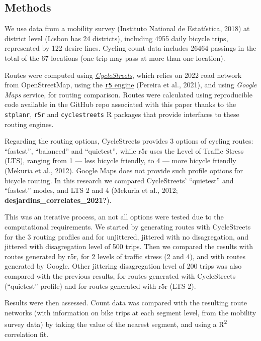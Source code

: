 \documentclass{isprs} %
\begin{document}
\hypertarget{methods}{%
\subsection{Methods}\label{methods}}

We use data from a mobility survey (Instituto National de Estatística, 2018) at district level (Lisbon has 24 districts), including 4955 daily bicycle trips, represented by 122 desire lines.
Cycling count data includes 26464 passings in the total of the 67 locations (one trip may pass at more than one location).

Routes were computed using \href{https://cyclestreets.net}{\emph{CycleStreets}}, which relies on 2022 road network from OpenStreetMap, using the \href{https://ipeagit.github.io/r5r/}{\texttt{r5} engine} (Pereira et al., 2021), and using \emph{Google Maps} service, for routing comparison.
Routes were calculated using reproducible code available in the GitHub repo associated with this paper thanks to the \texttt{stplanr}, \texttt{r5r} and \texttt{cyclestreets} R packages that provide interfaces to these routing engines.

Regarding the routing options, CycleStreets provides 3 options of cycling routes: ``fastest'', ``balanced'' and ``quietest'', while r5r uses the Level of Traffic Stress (LTS), ranging from 1 --- less bicycle friendly, to 4 --- more bicycle friendly (Mekuria et al., 2012). Google Maps does not provide such profile options for bicycle routing.
In this research we compared CycleStreets' ``quietest'' and ``fastest'' modes, and LTS 2 and 4 (Mekuria et al., 2012; \textbf{desjardins\_correlates\_2021?}).

This was an iterative process, an not all options were tested due to the computational requirements. We started by generating routes with CycleStreets for the 3 routing profiles and for unjittered, jittered with no disagregation, and jittered with disagregation level of 500 trips. Then we compared the results with routes generated by r5r, for 2 levels of traffic stress (2 and 4), and with routes generated by Google. Other jittering disagregation level of 200 trips was also compared with the previous results, for routes generated with CycleStreets (``quietest'' profile) and for routes generated with r5r (LTS 2).

Results were then assessed. Count data was compared with the resulting route networks (with information on bike trips at each segment level, from the mobility survey data) by taking the value of the nearest segment, and using a R\textsuperscript{2} correlation fit.
\end{document}
